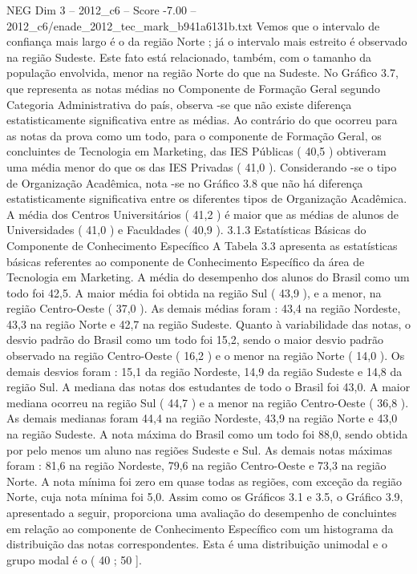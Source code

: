 \begin{textsample}{NEG Dim 3 – 2012\_c6 – Score -7.00 – 2012\_c6/enade\_2012\_tec\_mark\_b941a6131b.txt}
Vemos que o intervalo de confiança mais largo é o da região Norte ; já o intervalo mais estreito é observado na região Sudeste.
Este fato está relacionado, também, com o tamanho da população envolvida, menor na região Norte do que na Sudeste.
No Gráfico 3.7, que representa as notas médias no Componente de Formação Geral segundo Categoria Administrativa do país, observa -se que não existe diferença estatisticamente significativa entre as médias.
Ao contrário do que ocorreu para as notas da prova como um todo, para o componente de Formação Geral, os concluintes de Tecnologia em Marketing, das IES Públicas ( 40,5 ) obtiveram uma média menor do que os das IES Privadas ( 41,0 ).
Considerando -se o tipo de Organização Acadêmica, nota -se no Gráfico 3.8 que não há diferença estatisticamente significativa entre os diferentes tipos de Organização Acadêmica.
A média dos Centros Universitários ( 41,2 ) é maior que as médias de alunos de Universidades ( 41,0 ) e Faculdades ( 40,9 ). 3.1.3 Estatísticas Básicas do Componente de Conhecimento Específico A Tabela 3.3 apresenta as estatísticas básicas referentes ao componente de Conhecimento Específico da área de Tecnologia em Marketing.
A média do desempenho dos alunos do Brasil como um todo foi 42,5.
A maior média foi obtida na região Sul ( 43,9 ), e a menor, na região Centro-Oeste ( 37,0 ).
As demais médias foram : 43,4 na região Nordeste, 43,3 na região Norte e 42,7 na região Sudeste.
Quanto à variabilidade das notas, o desvio padrão do Brasil como um todo foi 15,2, sendo o maior desvio padrão observado na região Centro-Oeste ( 16,2 ) e o menor na região Norte ( 14,0 ).
Os demais desvios foram : 15,1 da região Nordeste, 14,9 da região Sudeste e 14,8 da região Sul.
A mediana das notas dos estudantes de todo o Brasil foi 43,0.
A maior mediana ocorreu na região Sul ( 44,7 ) e a menor na região Centro-Oeste ( 36,8 ).
As demais medianas foram 44,4 na região Nordeste, 43,9 na região Norte e 43,0 na região Sudeste.
A nota máxima do Brasil como um todo foi 88,0, sendo obtida por pelo menos um aluno nas regiões Sudeste e Sul.
As demais notas máximas foram : 81,6 na região Nordeste, 79,6 na região Centro-Oeste e 73,3 na região Norte.
A nota mínima foi zero em quase todas as regiões, com exceção da região Norte, cuja nota mínima foi 5,0.
Assim como os Gráficos 3.1 e 3.5, o Gráfico 3.9, apresentado a seguir, proporciona uma avaliação do desempenho de concluintes em relação ao componente de Conhecimento Específico com um histograma da distribuição das notas correspondentes.
Esta é uma distribuição unimodal e o grupo modal é o ( 40 ; 50 ].

\end{textsample}
